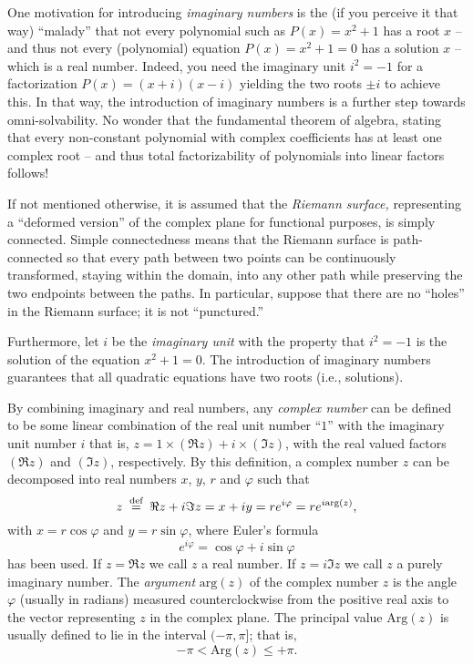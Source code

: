 One motivation for introducing
{\em imaginary numbers}
is the (if you perceive it that way)
``malady''
that not every polynomial such as $P(x)=x^2+1$ has a root $x$
-- and thus not every (polynomial) equation $P(x)=x^2+1=0$ has a
solution $x$  --
which is a real number.
Indeed, you need the imaginary unit $i^2 =-1$ for a factorization $P(x)=(x+i)(x-i)$ yielding the two roots $\pm i$
to achieve this.
In that way, the introduction of imaginary numbers is a further step towards omni-solvability.
No wonder that the fundamental theorem of algebra, stating that every
non-constant polynomial with complex coefficients has at least one complex root
--
and thus total factorizability of polynomials into linear factors follows!

If not mentioned otherwise, it is assumed that the
{\em Riemann surface,}
representing a ``deformed version'' of the complex plane for functional purposes,
is simply connected.
Simple connectedness means that the Riemann surface
is path-connected so that every path between two points can be continuously transformed, staying within the domain,
into any other path while preserving the two endpoints between the paths.
In particular, suppose that
there are no ``holes'' in the Riemann surface; it is not ``punctured.''

Furthermore, let $i$ be the
{\em imaginary unit}
 with the property that
 $i^2=-1$ is the solution of the equation $x^2+1=0$.
The introduction of imaginary numbers  guarantees that all quadratic
equations have two roots (i.e., solutions).


By combining imaginary and real numbers,
any {\em complex number} can be defined to be some linear combination of the real unit number ``$1$''
with the imaginary unit number $i$
that is,
$
z= 1 \times (\Re z)  +  i \times (\Im z)
$,
with the real valued factors $(\Re z) $
and $(\Im z)$, respectively.
By this definition,
a complex number $z$ can be decomposed into real numbers $x$, $y$, $r$ and $\varphi$ such that
\begin{equation}
z \stackrel{{\tiny \textrm{ def }}}{=}  \Re z + i \Im  z  =x +iy  =r e^{i\varphi}= r e^{i \textrm{arg}(z)},
\label{2017-m-ca-cn}
\end{equation}
with $x = r\cos \varphi$
and $y = r\sin \varphi$,
where {Euler's formula}
\begin{equation}
e^{i\varphi} = \cos \varphi +i \sin \varphi
\label{2012-m-ch-ca-ef}
\end{equation}
has been used.
If  $z = \Re z $ we call $z$ a real number.
If  $z = i\Im z $ we call $z$ a purely imaginary number.
The {\em argument} $\textrm{arg}(z)$ of the complex number $z$ is the angle $\varphi$ (usually in radians)
measured counterclockwise from the positive real axis to the vector representing $z$ in the complex plane.
The principal value $\textrm{Arg} (z)$ is usually defined to lie in   the interval $( - \pi, \pi ]$; that is,
\begin{equation}
-\pi < \textrm{Arg} (z) \le +\pi
.
\label{2018-m-ch-ca-ef}
\end{equation}

